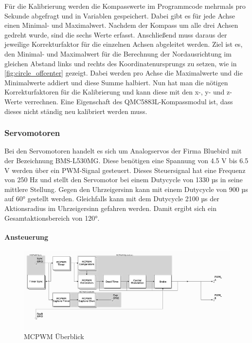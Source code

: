 Für die Kalibrierung werden die Kompasswerte im Programmcode mehrmals pro Sekunde abgefragt und in Variablen gespeichert.
Dabei gibt es für jede Achse einen Minimal- und Maximalwert.
Nachdem der Kompass um alle drei Achsen gedreht wurde, sind die sechs Werte erfasst.
Anschließend muss daraus der jeweilige Korrekturfaktor für die einzelnen Achsen abgeleitet werden.
Ziel ist es, den Minimal- und Maximalwert für die Berechnung der Nordausrichtung im gleichen Abstand links und rechts des Koordinatenursprungs zu setzen, wie in \autoref{fig:circle_offcenter} gezeigt.
Dabei werden pro Achse die Maximalwerte und die Minimalwerte addiert und diese Summe halbiert.
Nun hat man die nötigen Korrekturfaktoren für die Kalibrierung und kann diese mit den x-, y- und z-Werte verrechnen.
Eine Eigenschaft des QMC5883L-Kompassmodul ist, dass dieses nicht ständig neu kalibriert werden muss.

\subsubsection{Servomotoren}
Bei den Servomotoren handelt es sich um Analogservos der Firma Bluebird mit der Bezeichnung BMS-L530MG.
Diese benötigen eine Spannung von 4.5 V bis 6.5 V werden über ein PWM-Signal gesteuert.
Dieses Steuersignal hat eine Frequenz von 250 Hz und stellt den Servomotor bei einem Dutycycle von 1330 µs in seine mittlere Stellung.
Gegen den Uhrzeigersinn kann mit einem Dutycycle von 900 µs auf 60° gestellt werden.
Gleichfalls kann mit dem Dutycycle 2100 µs der Aktionsradius im Uhrzeigersinn gefahren werden.
Damit ergibt sich ein Gesamtaktionsbereich von 120°. \autocite{servomotor}

\paragraph{Ansteuerung}

\begin{figure}[htpb] %
    \centering
    \includegraphics[scale=0.7,keepaspectratio=true]{pics/mcpwmOverview.png}
    \caption{MCPWM Überblick}
    \label{fig:mcpwmOverview}
\end{figure}

